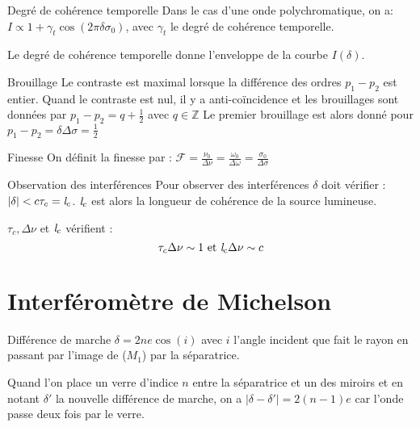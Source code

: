 \documentclass[french, a4paper, 11pt, twocolumn]{article}
\newcommand{\Z}{\mathbb{Z}}   %
\begin{document}
\begin{cadre}{Degré de cohérence temporelle}
  Dans le cas d'une onde polychromatique, on a: \(I\propto 1+\gamma_t\cos(2\pi \delta \sigma_0)\), avec \(\gamma_t\) le degré de cohérence temporelle.

  \tcblower
  Le degré de cohérence temporelle donne l'enveloppe de la courbe \(I(\delta)\).
\end{cadre}

\begin{cadre}{Brouillage}
  Le contraste est maximal lorsque la différence des ordres \(p_1-p_2\) est entier.
  Quand le contraste est nul, il y a anti-coïncidence et les brouillages sont données par \(p_1-p_2=q+\frac{1}{2}\) avec \(q\in \Z\)
  Le premier brouillage est alors donné pour \(p_1-p_2=\delta\Delta\sigma=\frac{1}{2}\)
\end{cadre}

\begin{cadre}{Finesse}
  On définit la finesse par : \(\mathcal{F}=\frac{\nu_0}{\Delta \nu}=\frac{\omega_0}{\Delta \omega}=\frac{\sigma_0}{\Delta \sigma}\)
\end{cadre}

\begin{cadre}{Observation des interférences}
  Pour observer des interférences \(\delta\) doit vérifier : \(|\delta|<c\tau_c=\emph{l}_c\).
  \(\emph{l}_c\) est alors la longueur de cohérence de la source lumineuse.

  \tcblower
  \(\tau_c, \Delta\nu\) et \(\emph{l}_c\) vérifient :
  \[\tau_c \Delta\nu \sim 1 \text{ et } \emph{l}_c \Delta\nu \sim c\]
\end{cadre}

\section{Interféromètre de Michelson}
\begin{cadre}{Différence de marche}
  \(\delta=2ne\cos(i)\) avec \(i\) l'angle incident que fait le rayon en passant par l'image de (\(M_1\)) par la séparatrice.

  \tcblower
  Quand l'on place un verre d'indice \(n\) entre la séparatrice et un des miroirs et en notant \(\delta'\) la nouvelle différence de marche,
  on a \(|\delta-\delta'|=2(n-1)e\) car l'onde passe deux fois par le verre.
\end{cadre}
\end{document}
